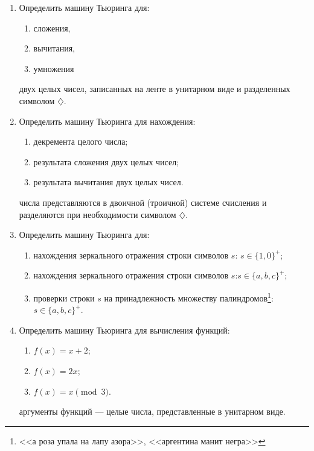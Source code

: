 \begin{enumerate}
    \item Определить машину Тьюринга для:
    \begin{enumerate}
        \item сложения, 
        \item вычитания, 
        \item умножения
    \end{enumerate}
    двух целых чисел, записанных на ленте в унитарном виде и разделенных символом $\diamondsuit$.
    
    \item Определить машину Тьюринга для нахождения:
    \begin{enumerate}
        \item декремента целого числа;
        \item результата сложения двух целых чисел;
        \item результата вычитания двух целых чисел.
    \end{enumerate}
    числа представляются в двоичной (троичной) системе счисления и разделяются при необходимости символом $\diamondsuit$.

    \item Определить машину Тьюринга для:
    \begin{enumerate}
        \item нахождения зеркального отражения строки символов $s$: $s\in\{1,0\}^+$;
        \item нахождения зеркального отражения строки символов $s$:$s\in\{a,b,c\}^+$;
        \item проверки строки $s$ на принадлежность множеству палиндромов\footnote{<<а роза упала на лапу азора>>, <<аргентина манит негра>>}:$s\in\{a,b,c\}^+$.
    \end{enumerate}
    
    
    \item Определить машину Тьюринга для вычисления функций:
    \begin{enumerate}
        \item $f(x)=x+2$;
        \item $f(x)=2x$;
        \item $f(x)=x\pmod 3$.
    \end{enumerate}
    аргументы функций --- целые числа, представленные в унитарном виде.
    
\end{enumerate}

